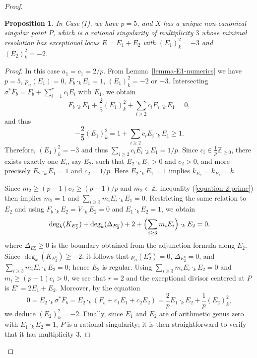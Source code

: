 \documentclass[reqno,oneside]{amsart}
\newtheorem{proposition}[theorem]{Proposition}
\theoremstyle{definition}
\theoremstyle{plain}
\numberwithin{equation}{section}
\begin{document}
\begin{proof}
\begin{proposition}\label{proposition-2/p}
  In Case\,{\rm(1)}, we have $p=5$, and $X$ has a unique non-canonical singular point $P$, which is a rational singularity of multiplicity $3$ whose minimal resolution has exceptional locus $E = E_1 + E_2$ with $(E_1)^2_{k} = -3$ and $(E_2)^2_{k} = -2$.
\end{proposition}
\begin{proof}
  In this case $a_1 = c_1 = 2/p$.
  From Lemma~\ref{lemma-E1-numerics} we have $p=5$, $p_a(E_1)=0$, $F_b\cdot_k E_1 = 1$, $(E_1)^2_k = -2$ or $-3$.
  Intersecting $\sigma^* \overline{F}_b = F_b + \sum_{i=1}^r c_i E_i$ with $E_1$, we obtain \[
    F_b\cdot_k E_1 + \frac{2}{5}(E_1)^2_k + \sum_{i\geq 2} c_i E_i\cdot_k E_1 =0,
  \]
  and thus \[
    -\frac{2}{5}(E_1)^2_k = 1 +\sum_{i\geq 2} c_i E_i\cdot_k E_1 \ge 1.
  \]
  Therefore, $(E_1)^2_k = -3$ and thus $\sum_{i\geq 2} c_i E_i\cdot_k E_1 = 1/p$.
  Since $c_i\in \frac1p \mathbb Z_{\ge0}$, there exists exactly one $E_i$, say $E_2$, such that $E_2 \cdot_k E_1 > 0$ and $c_2 >0$,
  and more precisely $E_2 \cdot_k E_1 = 1$ and $c_2 = 1/p$.
  Here $E_2\cdot_k E_1 =1$ implies $k_{E_2}= k_{E_1} = k$.

Since $m_2 \geq (p-1)c_2 \ge (p-1)/p$ and $m_2\in \mathbb{Z}$, inequality (\ref{equation-2-prime}) then implies $m_2=1$ and $\sum_{i\geq 3} m_i E_i\cdot_k E_1 =0$.
Restricting the same relation to $E_2$ and using $F_b\cdot_k E_2 = V\cdot_k E_2 = 0$ and $E_1\cdot_k E_2 = 1$, we obtain
\begin{equation}\label{equation-E2}
  \deg_k(K_{E_2^\nu}) + \deg_k(\Delta_{E_2^\nu}) + 2 + \Bigl(\sum_{i\geq 3} m_i E_i\Bigr)\cdot_k E_2 = 0,
\end{equation}
where $\Delta_{E_2^\nu}\ge0$ is the boundary obtained from the adjunction formula along $E_2$.
Since $\deg_k(K_{E_2^\nu}) \ge -2$, it follows that $p_a(E_2^\nu) = 0$, $\Delta_{E_2^\nu} = 0$, and $\sum_{i\geq 3} m_i E_i \cdot_k E_2 = 0$; hence $E_2$ is regular.
Using $\sum_{i\geq 3} m_i E_i \cdot_k E_2 = 0$ and $m_i \ge (p-1)c_i >0$, we see that $r=2$ and the exceptional divisor centered at $P$ is $E'=2E_1+E_2$.
Moreover, by the equation
\[
  0 = E_2 \cdot_k \sigma^* \overline{F}_b =E_2 \cdot_k (F_b+ c_1 E_1 + c_2 E_2) = \frac{2}{p} E_1\cdot_k E_2 + \frac{1}{p} (E_2)^2_k,
\]
we deduce $(E_2)^2_k = -2$.
Finally, since $E_1$ and $E_2$ are of arithmetic genus zero with $E_1 \cdot_k E_2 = 1$, $P$ is a rational singularity; it is then straightforward to verify that it has multiplicity $3$.
\end{proof}


\end{proof}
\end{document}
